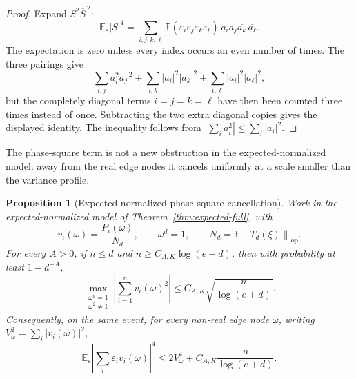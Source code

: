 \documentclass[11pt]{amsart}
\numberwithin{equation}{section}
\newtheorem{proposition}[theorem]{Proposition}
\theoremstyle{definition}
\theoremstyle{remark}
\newcommand{\op}{\mathrm{op}}
\newcommand{\Exp}{\mathbb E}
\newcommand{\norm}[1]{\left\lVert #1\right\rVert}
\newcommand{\eps}{\varepsilon}
\begin{document}
\begin{proof}
Expand \(S^2\overline S^{\,2}\):
\[
  \Exp_\eps |S|^4
  =
  \sum_{i,j,k,\ell}
  \Exp(\eps_i\eps_j\eps_k\eps_\ell)\,
  a_i a_j\overline{a_k}\,\overline{a_\ell}.
\]
The expectation is zero unless every index occurs an even number of times.  The
three pairings give
\[
  \sum_{i,j}a_i^2\overline{a_j}^{\,2}
  +\sum_{i,k}|a_i|^2|a_k|^2
  +\sum_{i,\ell}|a_i|^2|a_\ell|^2,
\]
but the completely diagonal terms \(i=j=k=\ell\) have then been counted three
times instead of once.  Subtracting the two extra diagonal copies gives the
displayed identity.  The inequality follows from
\(|\sum_i a_i^2|\le\sum_i|a_i|^2\).
\end{proof}

The phase-square term is not a new obstruction in the expected-normalized model:
away from the real edge nodes it cancels uniformly at a scale smaller than the
variance profile.

\begin{proposition}[Expected-normalized phase-square cancellation]
\label{prop:expected-phase-square}
Work in the expected-normalized model of Theorem~\ref{thm:expected-full}, with
\[
  v_i(\omega)=\frac{P_i(\omega)}{N_d},\qquad \omega^d=1,
  \qquad N_d=\Exp\norm{T_d(\xi)}_{\op}.
\]
For every \(A>0\), if \(n\le d\) and \(n\ge C_{A,K}\log(e+d)\), then with
probability at least \(1-d^{-A}\),
\[
  \max_{\substack{\omega^d=1\\ \omega^2\ne1}}
  \left|\sum_{i=1}^n v_i(\omega)^2\right|
  \le C_{A,K}\sqrt{\frac{n}{\log(e+d)}} .
\]
Consequently, on the same event, for every non-real edge node \(\omega\),
writing \(V_\omega^2=\sum_i|v_i(\omega)|^2\),
\[
  \Exp_\eps\left|\sum_i\eps_i v_i(\omega)\right|^4
  \le 2V_\omega^4+C_{A,K}\frac{n}{\log(e+d)} .
\]
\end{proposition}
\end{document}
